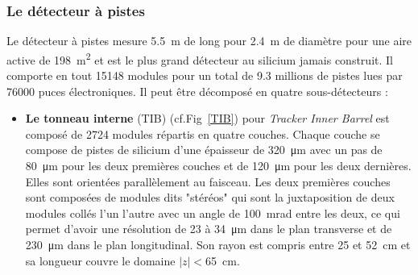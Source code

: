 \subsubsection{Le détecteur à pistes}
Le détecteur à pistes mesure \SI{5.5}{\meter} de long pour \SI{2.4}{\meter} de diamètre pour une aire active de \SI{198}{\square\meter} et est le plus grand détecteur au silicium jamais construit. Il comporte en tout \num{15148} modules pour un total de \num{9.3} millions de pistes lues par \num{76000} puces électroniques. Il peut être décomposé en quatre sous-détecteurs :

\begin{itemize}[label=$\bullet$]
\item \textbf{Le tonneau interne} (TIB) (cf.Fig~\ref{TIB}) pour  \textit{Tracker Inner Barrel} est composé de \num{2724} modules répartis en quatre couches. Chaque couche se compose de pistes de silicium d'une épaisseur de \SI{320}{\micro\meter} avec un pas de \SI{80}{\micro\meter} pour les deux premières couches et de \SI{120}{\micro\meter} pour les deux dernières. Elles sont orientées parallèlement au faisceau. Les deux premières couches sont composées de modules dits "stéréos" qui sont la juxtaposition de deux modules collés l'un l'autre avec un angle de \SI{100}{\milli\radian} entre les deux, ce qui permet d'avoir une résolution de \num{23} à \SI{34}{\micro\m} dans le plan transverse et de \SI{230}{\micro\meter} dans le plan longitudinal. Son rayon est compris entre \num{25} et \SI{52}{\centi\meter} et sa longueur couvre le domaine $|z|<$\SI{65}{\centi\meter}.


\end{itemize}
